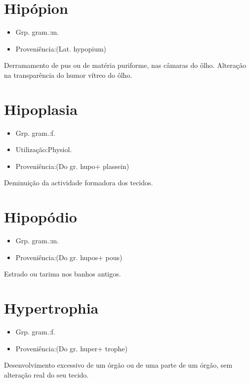 \documentclass{article}
\begin{document}
\section{Hipópion}
\begin{itemize}
\item {Grp. gram.:m.}
\end{itemize}
\begin{itemize}
\item {Proveniência:(Lat. \textunderscore hypopium\textunderscore )}
\end{itemize}
Derramamento de pus ou de matéria puriforme, nas câmaras do ôlho.
Alteração na transparência do humor vítreo do ôlho.
\section{Hipoplasia}
\begin{itemize}
\item {Grp. gram.:f.}
\end{itemize}
\begin{itemize}
\item {Utilização:Physiol.}
\end{itemize}
\begin{itemize}
\item {Proveniência:(Do gr. \textunderscore hupo\textunderscore  + \textunderscore plassein\textunderscore )}
\end{itemize}
Deminuição da actividade formadora dos tecidos.
\section{Hipopódio}
\begin{itemize}
\item {Grp. gram.:m.}
\end{itemize}
\begin{itemize}
\item {Proveniência:(Do gr. \textunderscore hupos\textunderscore  + \textunderscore pous\textunderscore )}
\end{itemize}
Estrado ou tarima nos banhos antigos.
\section{Hypertrophia}
\begin{itemize}
\item {Grp. gram.:f.}
\end{itemize}
\begin{itemize}
\item {Proveniência:(Do gr. \textunderscore huper\textunderscore  + \textunderscore trophe\textunderscore )}
\end{itemize}
Desenvolvimento excessivo de um órgão ou de uma parte de um órgão, sem alteração real do seu tecido.
\end{document}
